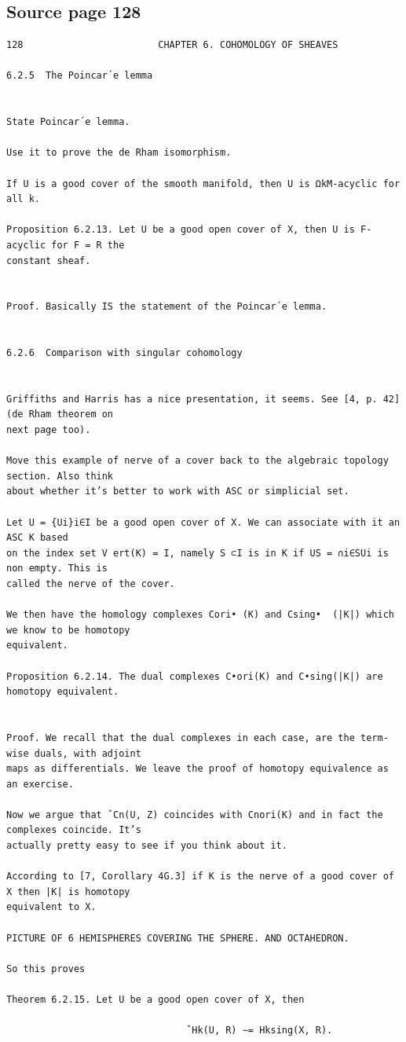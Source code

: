 \subsection*{Source page 128}
\begin{Verbatim}[fontsize=\small]
128                        CHAPTER 6. COHOMOLOGY OF SHEAVES

6.2.5  The Poincar´e lemma


State Poincar´e lemma.

Use it to prove the de Rham isomorphism.

If U is a good cover of the smooth manifold, then U is ΩkM-acyclic for all k.

Proposition 6.2.13. Let U be a good open cover of X, then U is F-acyclic for F = R the
constant sheaf.


Proof. Basically IS the statement of the Poincar´e lemma.


6.2.6  Comparison with singular cohomology


Griffiths and Harris has a nice presentation, it seems. See [4, p. 42] (de Rham theorem on
next page too).

Move this example of nerve of a cover back to the algebraic topology section. Also think
about whether it’s better to work with ASC or simplicial set.

Let U = {Ui}i∈I be a good open cover of X. We can associate with it an ASC K based
on the index set V ert(K) = I, namely S ⊂I is in K if US = ∩i∈SUi is non empty. This is
called the nerve of the cover.

We then have the homology complexes Cori• (K) and Csing•  (|K|) which we know to be homotopy
equivalent.

Proposition 6.2.14. The dual complexes C•ori(K) and C•sing(|K|) are homotopy equivalent.


Proof. We recall that the dual complexes in each case, are the term-wise duals, with adjoint
maps as differentials. We leave the proof of homotopy equivalence as an exercise.

Now we argue that ˇCn(U, Z) coincides with Cnori(K) and in fact the complexes coincide. It’s
actually pretty easy to see if you think about it.

According to [7, Corollary 4G.3] if K is the nerve of a good cover of X then |K| is homotopy
equivalent to X.

PICTURE OF 6 HEMISPHERES COVERING THE SPHERE. AND OCTAHEDRON.

So this proves

Theorem 6.2.15. Let U be a good open cover of X, then

                                ˇHk(U, R) ∼= Hksing(X, R).
\end{Verbatim}

